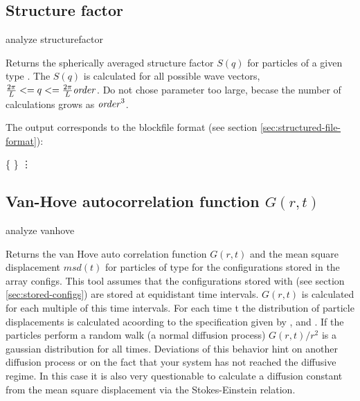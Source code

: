\subsection{Structure factor}
\label{analyze:structurefactor}

\begin{essyntax}
  analyze structurefactor  
\end{essyntax}

Returns the spherically averaged structure factor $S(q)$ for particles
of a given type . The $S(q)$ is calculated for all possible
wave vectors, $\frac{2\pi}{L} <= q <= \frac{2\pi}{L}\mbox{\textrm{\textit{order}}}$. Do
not chose parameter  too large, becase the number of
calculations grows as $\mbox{\textrm{\textit{order}}}^3$. 



The output corresponds to the blockfile format (see section
\vref{sec:structured-file-format}):
\begin{code}
\{   \} 
\vdots
\end{code}

\subsection{Van-Hove autocorrelation function $G(r,t)$}
\label{analyze:vanhove}
\begin{essyntax}
  analyze vanhove    
\end{essyntax}
Returns the van Hove auto correlation function $G(r,t)$ and the mean
square displacement $msd(t)$ for particles of type  for the
configurations stored in the array configs. This tool assumes that the
configurations stored with  (see section
\vref{sec:stored-configs}) are stored at equidistant time intervals.
$G(r,t)$ is calculated for each multiple of this time intervals. For
each time t the distribution of particle displacements is calculated
acoording to the specification given by ,  and
. If the particles perform a random walk (\ie a normal
diffusion process) $G(r,t)/r^2$ is a gaussian distribution for all
times.  Deviations of this behavior hint on another diffusion process
or on the fact that your system has not reached the diffusive regime.
In this case it is also very questionable to calculate a diffusion
constant from the mean square displacement via the Stokes-Einstein
relation. 

